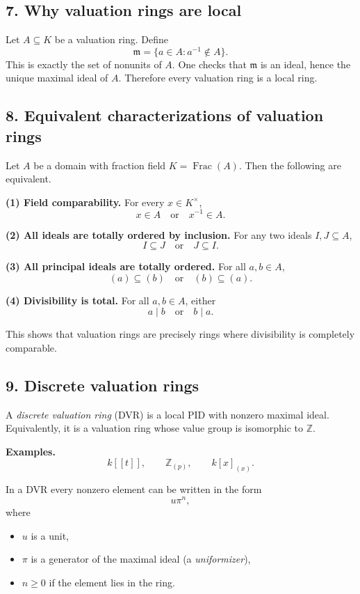 \documentclass[12pt,a4paper]{article}
\theoremstyle{notespace}
\DeclareMathOperator{\Frac}{Frac}
\begin{document}
\subsection*{7. Why valuation rings are local}

Let \(A\subseteq K\) be a valuation ring. Define
\[
\mathfrak m=\{a\in A : a^{-1}\notin A\}.
\]
This is exactly the set of nonunits of \(A\). One checks that \(\mathfrak m\) is an ideal, hence the unique maximal ideal of \(A\). Therefore every valuation ring is a local ring.

\subsection*{8. Equivalent characterizations of valuation rings}

Let \(A\) be a domain with fraction field \(K=\Frac(A)\). Then the following are equivalent.

\textbf{(1) Field comparability.}
For every \(x\in K^\times\),
\[
x\in A \quad \text{or} \quad x^{-1}\in A.
\]

\textbf{(2) All ideals are totally ordered by inclusion.}
For any two ideals \(I,J\subseteq A\),
\[
I\subseteq J \quad \text{or} \quad J\subseteq I.
\]

\textbf{(3) All principal ideals are totally ordered.}
For all \(a,b\in A\),
\[
(a)\subseteq (b) \quad \text{or} \quad (b)\subseteq (a).
\]

\textbf{(4) Divisibility is total.}
For all \(a,b\in A\), either
\[
a\mid b \quad \text{or} \quad b\mid a.
\]

This shows that valuation rings are precisely rings where divisibility is completely comparable.

\subsection*{9. Discrete valuation rings}

A \emph{discrete valuation ring} (DVR) is a local PID with nonzero maximal ideal. Equivalently, it is a valuation ring whose value group is isomorphic to \(\mathbb Z\).

\textbf{Examples.}
\[
k[[t]], \qquad \mathbb Z_{(p)}, \qquad k[x]_{(x)}.
\]

In a DVR every nonzero element can be written in the form
\[
u\pi^n,
\]
where
\begin{itemize}
	\item \(u\) is a unit,
	\item \(\pi\) is a generator of the maximal ideal (a \emph{uniformizer}),
	\item \(n\ge 0\) if the element lies in the ring.
\end{itemize}
\end{document}
